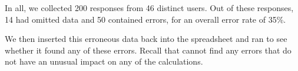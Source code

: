 In all, we collected 200 responses from 46 distinct users. Out of
these responses, 14 had omitted data and 50 contained errors, for an
overall error rate of 35\%.

We then inserted this erroneous data back into the spreadsheet and
ran \checkcell{} to see whether it found any of these errors. Recall
that \checkcell{} cannot find any errors that do not have an unusual
impact on any of the calculations.

